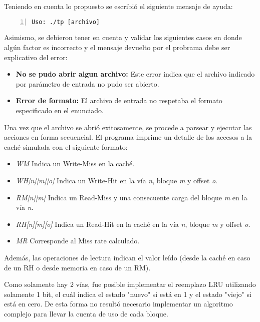 \documentclass[11pt,a4paper, spanish]{article}
\begin{document}
Teniendo en cuenta lo propuesto se escribi\'o el siguiente mensaje de ayuda:

\begin{lstlisting}[numbers=left, tabsize=2, basicstyle=\fontsize{11}{13}\ttfamily, frame=single, caption={Mensaje de ayuda del programa}]
Uso: ./tp [archivo]
\end{lstlisting}

Asimismo, se debieron tener en cuenta y validar los siguientes casos en donde alg\'un factor es incorrecto y el mensaje devuelto por el probrama debe ser explicativo del error:

\begin{itemize}
\item \textbf{No se pudo abrir algun archivo:} Este error indica que el archivo indicado por parámetro de entrada no pudo ser abierto.
\item \textbf{Error de formato:} El archivo de entrada no respetaba el formato especificado en el enunciado.
\end{itemize}

Una vez que el archivo se abrió exitosamente, se procede a parsear y ejecutar las acciones en forma secuencial.
El programa imprime un detalle de los accesos a la caché simulada con el siguiente formato:

\begin{itemize}
\item \textit{WM} Indica un Write-Miss en la caché.
\item \textit{WH[n][m][o]} Indica un Write-Hit en la vía \textit{n}, bloque \textit{m} y offset \textit{o}.
\item \textit{RM[n][m]} Indica un Read-Miss y una consecuente carga del bloque \textit{m} en la vía \textit{n}.
\item \textit{RH[n][m][o]} Indica un Read-Hit en la caché en la vía \textit{n}, bloque \textit{m} y offset \textit{o}.
\item \textit{MR} Corresponde al Miss rate calculado.
\end{itemize}

Además, las operaciones de lectura indican el valor leído (desde la caché en caso de un RH o desde memoria en caso de un RM).

Como solamente hay 2 vías, fue posible implementar el reemplazo LRU utilizando solamente 1 bit, el cuál indica
el estado "nuevo" si está en 1 y el estado "viejo" si está en cero. De esta forma no resultó necesario implementar
un algoritmo complejo para llevar la cuenta de uso de cada bloque.
\end{document}
